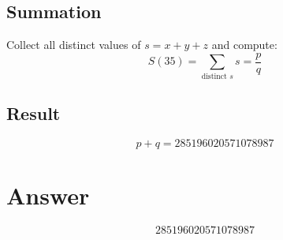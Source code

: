 \documentclass[12pt]{article}
\begin{document}
\subsection{Summation}

Collect all distinct values of $s = x + y + z$ and compute:
\[
S(35) = \sum_{\text{distinct } s} s = \frac{p}{q}
\]

\subsection{Result}

\[
p + q = \boxed{285196020571078987}
\]

\section{Answer}

\[
\boxed{285196020571078987}
\]
\end{document}
